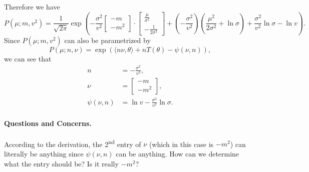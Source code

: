 \documentclass[12pt]{article}
\begin{document}
Therefore we have \[P\left( \mu;m,v^2 \right)=\frac{1}{\sqrt{2\pi}}\exp\left( -\frac{\sigma^2}{v^2}\begin{bmatrix}
      -m \\-m^2
    \end{bmatrix}\cdot\begin{bmatrix}
      \frac{\mu}{\sigma^2} \\-\frac{1}{2\sigma^2}
    \end{bmatrix}+\left( -\frac{\sigma^2}{v^2}\right)\left( \frac{\mu^2}{2\sigma^2}+\ln\sigma \right)+\frac{\sigma^2}{v^2}\ln\sigma-\ln v  \right).\]
Since $P(\mu;m,v^2)$ can also be parametrized by \[ P(\mu;n,\nu)=\exp\left( \langle n\nu,\theta\rangle+nT(\theta)-\psi(\nu,n) \right), \] we can see that
\begin{align*}
  n           & =-\frac{\sigma^2}{v^2},              \\
  \nu         & =\begin{bmatrix}
    -m \\-m^2
  \end{bmatrix},         \\
  \psi(\nu,n) & =\ln v-\frac{\sigma^2}{v^2}\ln\sigma.
\end{align*}

\paragraph{Questions and Concerns.} According to the derivation, the 2\textsuperscript{nd} entry of $\nu$ (which in this case is $-m^2$) can literally be anything since $\psi(\nu,n)$ can be anything. How can we determine what the entry should be? Is it really $-m^2$?
\end{document}
